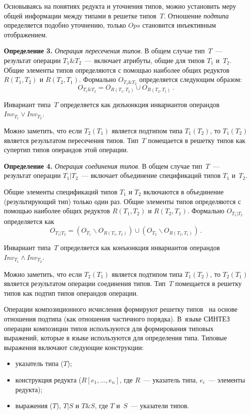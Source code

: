 \begin{multicols}{2}
     Основываясь на понятиях редукта и уточнения типов, можно установить меру общей
информации между типами в решетке типов~$T$. Отношение \textit{подтипа}
определяется подобно уточнению, только $Ops$ становится инъективным отображением.

\bigskip

\noindent
\textbf{Определение 3.} \textit{Операция пересечения типов}. В общем случае
тип~$T$~--- результат операции $T_1$\&$T_2$~--- включает атрибуты, общие для типов
$T_1$ и~$T_2$. Общие элементы типов определяются с помощью наиболее общих
редуктов $R(T_1,T_2)$ и $R(T_2,T_1)$. Формально $O_{T_1\&T_2}$ определяется
следующим образом:
$$
O_{T_1\&T_2} = O_{R(T_1,T_2)}\cup  O_{R(T_2,T_1)}\,.
     $$

     Инвариант типа~$T$ определяется как дизъюнкция инвариантов операндов
$Inv_{T_1}\vee  Inv_{T_2}$.

     Можно заметить, что если $T_2 (T_1)$ является подтипом типа $T_1 (T_2)$, то $T_1
(T_2)$ является результатом пересечения типов. Тип~$T$ помещается в решетку типов как
супертип типов операндов этой операции.

\bigskip

\noindent
\textbf{Определение 4.} \textit{Операция соединения типов}. В общем случае
тип~$T$~--- результат операции $T_1\vert T_2$~--- включает объединение спецификаций
типов $T_1$ и~$T_2$.

Общие элементы спецификаций типов $T_1$ и $T_2$ включаются
в объединение (результирующий тип) только один раз. Общие элементы типов
определяются с помощью наиболее общих редуктов $R(T_1,T_2)$ и $R(T_2,T_1)$.
Формально $O_{T_1\vert T_2}$ определяется как
$$
O_{T_1\vert T_2} = \left ( O_{T_1}\backslash O_{R(T_1,T_2)}\right ) \cup \left
(O_{T_2}\backslash O_{R(T_2,T_1)}\right )\,.
$$

     Инвариант типа~$T$ определяется как конъюнкция инвариантов операндов $Inv_{T_1}
\wedge  Inv_{T_2}$.

     Можно заметить, что если $T_2 (T_1)$ является подтипом типа $T_1 (T_2)$, то $T_2
(T_1)$ является результатом операции соединения типов. Тип~$T$ помещается в решетку
типов как подтип типов операндов операции.

     Операции композиционного исчисления формируют решетку типов~\cite{Kla99} на
основе отношения подтипа (как отношения частичного порядка). В~языке СИНТЕЗ
операции композиции типов используются для формирования типовых выражений,
которые в языке используются для определения типа. Типовые выражения включают
сле\-ду\-ющие конструкции:
     \begin{itemize}
\item указатель типа ($T$);
\item конструкция редукта ($R[e_1, \ldots , e_n]$, где $R$~--- указатель типа, $e_i$~---
элементы редукта);
\item выражения ($T$), $T\vert S$ и $T\&S$, где $T$
и~$S$~--- указатели типов.
\end{itemize}


\end{multicols}
